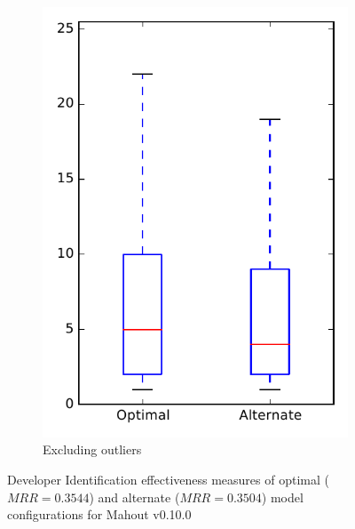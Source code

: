 \begin{figure}
\begin{subfigure}{.4\textwidth}
        \includegraphics[height=0.4\textheight]{figures/combo/dit_rq1_mahout_no_outlier}
        \caption{Excluding outliers}\label{fig:combo:dit:rq1:mahout_no_outlier}
    \end{subfigure}
\caption[Developer Identification effectiveness measures of optimal and alternate model configurations for Mahout v0.10.0]%
{Developer Identification effectiveness measures of optimal ($MRR=0.3544$) and alternate ($MRR=0.3504$) model configurations for Mahout v0.10.0}
\label{fig:combo:dit:rq1:mahout}
\end{figure}
